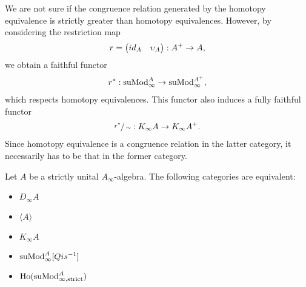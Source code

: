 \documentclass[../thesis.tex]{subfiles}
\begin{document}
            We are not sure if the congruence relation generated by the homotopy equivalence is strictly greater than homotopy equivalences. However, by considering the restriction map
            \begin{align*}
                r = \begin{pmatrix}
                    id_A & \upsilon_A
                \end{pmatrix} : A^+ \rightarrow A\tt{,} 
            \end{align*}
            we obtain a faithful functor
            \begin{align*}
                r^* : \tt{suMod}_\infty^A \rightarrow \tt{suMod}_\infty^{A^+}\tt{,}
            \end{align*}
            which respects homotopy equivalences. This functor also induces a fully faithful functor
            \begin{align*}
                \sfrac{r^*}{\sim} : K_\infty A \rightarrow K_\infty A^+\tt{.}
            \end{align*}
            Since homotopy equivalence is a congruence relation in the latter category, it necessarily has to be that in the former category.

            \begin{thm}
                Let $A$ be a strictly unital $A_\infty$-algebra. The following categories are equivalent:
                \begin{itemize}
                    \item $D_\infty A$
                    \item $\langle A \rangle$
                    \item $K_\infty A$
                    \item $\tt{suMod}_\infty^A[Qis^{-1}]$
                    \item $\tt{Ho}(\tt{suMod}_{\infty,\tt{strict}}^A)$
                \end{itemize}
            \end{thm}
\end{document}

